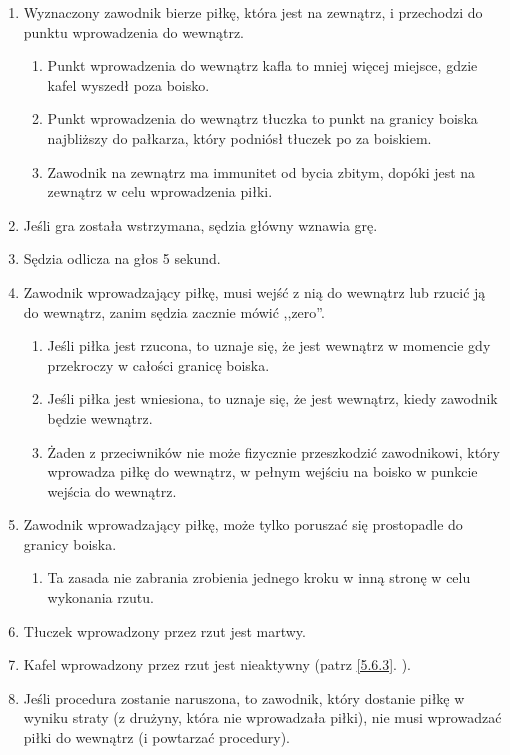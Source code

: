 \documentclass[11pt,a4paper]{article}
\newcommand{\myref}[1]{\ref{#1}. \nameref{#1}}
\begin{document}
\begin{enumerate}

\item
  Wyznaczony zawodnik bierze piłkę, która jest na zewnątrz, i przechodzi
  do punktu wprowadzenia do wewnątrz.

  \begin{enumerate}
  
  \item
    Punkt wprowadzenia do wewnątrz kafla to mniej więcej miejsce, gdzie
    kafel wyszedł poza boisko.
  \item
    Punkt wprowadzenia do wewnątrz tłuczka to punkt na granicy boiska
    najbliższy do pałkarza, który podniósł tłuczek po za boiskiem.
  \item
    Zawodnik na zewnątrz ma immunitet od bycia zbitym, dopóki jest na
    zewnątrz w celu wprowadzenia piłki.
  \end{enumerate}
\item
  Jeśli gra została wstrzymana, sędzia główny wznawia grę.
\item
  Sędzia odlicza na głos 5 sekund.
\item
  Zawodnik wprowadzający piłkę, musi wejść z nią do wewnątrz lub rzucić
  ją do wewnątrz, zanim sędzia zacznie mówić ,,zero''.

  \begin{enumerate}
  
  \item
    Jeśli piłka jest rzucona, to uznaje się, że jest wewnątrz w momencie
    gdy przekroczy w całości granicę boiska.
  \item
    Jeśli piłka jest wniesiona, to uznaje się, że jest wewnątrz, kiedy
    zawodnik będzie wewnątrz.
  \item
    Żaden z przeciwników nie może fizycznie przeszkodzić zawodnikowi,
    który wprowadza piłkę do wewnątrz, w pełnym wejściu na boisko w
    punkcie wejścia do wewnątrz.
  \end{enumerate}
\item
  Zawodnik wprowadzający piłkę, może tylko poruszać się prostopadle do
  granicy boiska.

  \begin{enumerate}
  
  \item
    Ta zasada nie zabrania zrobienia jednego kroku w inną stronę w celu
    wykonania rzutu.
  \end{enumerate}
\item
  Tłuczek wprowadzony przez rzut jest martwy.
\item
  Kafel wprowadzony przez rzut jest nieaktywny (patrz \myref{5.6.3}).
\item
  Jeśli procedura zostanie naruszona, to zawodnik, który dostanie piłkę
  w wyniku straty (z drużyny, która nie wprowadzała piłki), nie musi
  wprowadzać piłki do wewnątrz (i powtarzać procedury).
\end{enumerate}
\end{document}
